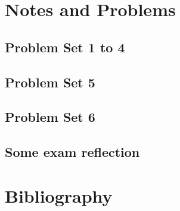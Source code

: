 \part{Notes and Problems}
   \chapter{Problem Set 1 to 4}
      
      
      
      
      
   \chapter{Problem Set 5}
      
   \chapter{Problem Set 6}
      
   \chapter{Some exam reflection}
      

\part{Bibliography}
